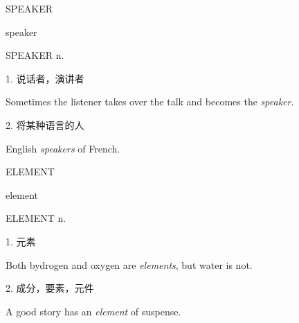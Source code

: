 \begin{flashcard}{
SPEAKER

speaker
}
\begin{center}
SPEAKER n. 
\end{center}
1. 说话者，演讲者

Sometimes the listener takes over the talk and becomes the \textit{speaker}.

2. 将某种语言的人

English \textit{speakers} of French.

\end{flashcard}
\begin{flashcard}{
ELEMENT

element
}
\begin{center}
ELEMENT n. 
\end{center}
1. 元素

Both bydrogen and oxygen are \textit{elements}, but water is not.

2. 成分，要素，元件

A good story has an \textit{element} of suspense.

\end{flashcard}

